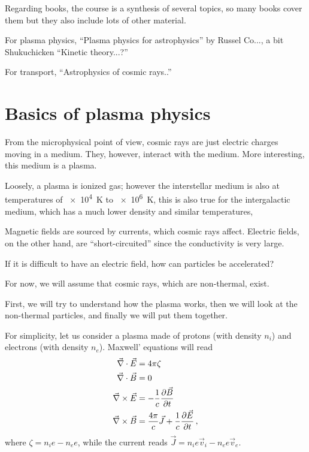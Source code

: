 \documentclass[main.tex]{subfiles}
\begin{document}

Regarding books, the course is a synthesis of several topics, so many books cover them but they also include lots of other material.

For plasma physics, ``Plasma physics for astrophysics'' by Russel Co...,
a bit Shukuchicken ``Kinetic theory...?''

For transport, ``Astrophysics of cosmic rays..''

\section{Basics of plasma physics}

From the microphysical point of view, cosmic rays are just electric charges moving in a medium. 
They, however, interact with the medium. 
More interesting, this medium is a plasma. 

Loosely, a plasma is ionized gas; however the interstellar medium is also at temperatures of \SI{e4}{K} to \SI{e6}{K}, this is also true for the intergalactic medium, which has a much lower density and similar temperatures, 


Magnetic fields are sourced by currents, which cosmic rays affect. 
Electric fields, on the other hand, are ``short-circuited'' since the conductivity is very large. 

If it is difficult to have an electric field, how can particles be accelerated? 

For now, we will assume that cosmic rays, which are non-thermal, exist. 

First, we will try to understand how the plasma works, then we will look at the non-thermal particles, and finally we will put them together. 

For simplicity, let us consider a plasma made of protons (with density \(n_i\)) and electrons (with density \(n_e\)). 
Maxwell' equations will read 
%
\begin{subequations}\label{eq:maxwell}
\begin{align}
\vec{\nabla} \cdot \vec{E} &= 4 \pi \zeta  \\
\vec{\nabla} \cdot \vec{B} &= 0  \\
\vec{\nabla} \times \vec{E} &= - \frac{1}{c} \pdv{\vec{B}}{t}  \\
\vec{\nabla} \times \vec{B} &= \frac{4 \pi }{c} \vec{J} + \frac{1}{c} \pdv{\vec{E}}{t}
\,,
\end{align}
\end{subequations}
%
where \(\zeta = n_i e - n_e e\), while the current reads \(\vec{J} = n_i e \vec{v}_i - n_e e \vec{v}_e\). 
\end{document}
